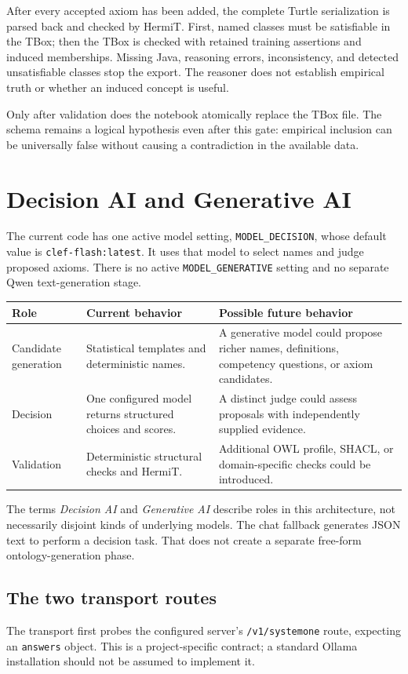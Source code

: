 \documentclass[11pt,a4paper]{article}
\newcommand{\code}[1]{\nolinkurl{#1}}
\begin{document}
After every accepted axiom has been added, the complete Turtle serialization is
parsed back and checked by HermiT. First, named classes must be satisfiable in the
TBox; then the TBox is checked with retained training assertions and induced
memberships. Missing Java, reasoning errors, inconsistency, and detected
unsatisfiable classes stop the export. The reasoner does not establish empirical
truth or whether an induced concept is useful.

Only after validation does the notebook atomically replace the TBox file. The
schema remains a logical hypothesis even after this gate: empirical inclusion
can be universally false without causing a contradiction in the available data.

\section{Decision AI and Generative AI}\label{sec:ai}

The current code has one active model setting, \code{MODEL_DECISION}, whose
default value is \code{clef-flash:latest}. It uses that model to select names and
judge proposed axioms. There is no active \code{MODEL_GENERATIVE} setting and no
separate Qwen text-generation stage.

\begin{tabularx}{\textwidth}{@{}P{35mm}YY@{}}
\toprule
Role & Current behavior & Possible future behavior \\
\midrule
Candidate generation & Statistical templates and deterministic names. & A generative model could propose richer names, definitions, competency questions, or axiom candidates. \\
Decision & One configured model returns structured choices and scores. & A distinct judge could assess proposals with independently supplied evidence. \\
Validation & Deterministic structural checks and HermiT. & Additional OWL profile, SHACL, or domain-specific checks could be introduced. \\
\bottomrule
\end{tabularx}

The terms \emph{Decision AI} and \emph{Generative AI} describe roles in this
architecture, not necessarily disjoint kinds of underlying models. The chat
fallback generates JSON text to perform a decision task. That does not create
a separate free-form ontology-generation phase.

\subsection{The two transport routes}
The transport first probes the configured server's \code{/v1/systemone} route,
expecting an \code{answers} object. This is a project-specific contract; a
standard Ollama installation should not be assumed to implement it.
\end{document}
